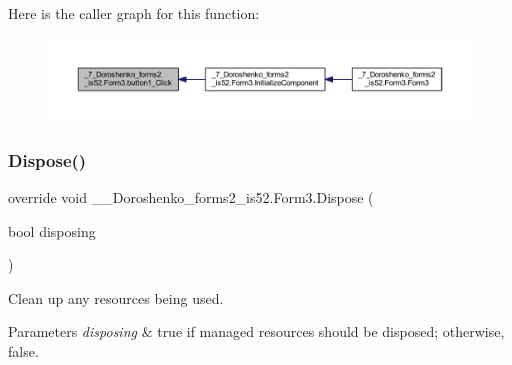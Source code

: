 Here is the caller graph for this function\+:
\nopagebreak
\begin{figure}[H]
\begin{center}
\leavevmode
\includegraphics[width=350pt]{class__7___doroshenko__forms2__is52_1_1_form3_a77c7b13a40218b6c1b9401bb82187636_icgraph}
\end{center}
\end{figure}
\hypertarget{class__7___doroshenko__forms2__is52_1_1_form3_a84df79232699c339a7858409d4a5709c}{}\label{class__7___doroshenko__forms2__is52_1_1_form3_a84df79232699c339a7858409d4a5709c} 
\subsubsection{\texorpdfstring{Dispose()}{Dispose()}}
{\footnotesize\ttfamily override void \+\_\+\_\+\+Doroshenko\+\_\+forms2\+\_\+is52.\+Form3.\+Dispose (\begin{DoxyParamCaption}\item[{bool}]{disposing }\end{DoxyParamCaption})\hspace{0.3cm}{\ttfamily [protected]}}



Clean up any resources being used. 


\begin{DoxyParams}{Parameters}
{\em disposing} & true if managed resources should be disposed; otherwise, false.\\
\hline
\end{DoxyParams}
\hypertarget{class__7___doroshenko__forms2__is52_1_1_form3_abc403685bfbc9b5da1201d7ecd0ee1e5}{}\label{class__7___doroshenko__forms2__is52_1_1_form3_abc403685bfbc9b5da1201d7ecd0ee1e5} 
